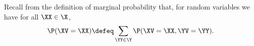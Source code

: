 \begin{definition}
  Recall from the definition of marginal probability that,
  for random variables 
  we have for all $\XX \in \X$,
  $$\P(\XV = \XX) \defeq \sum_{\YY \in \Y}\P(\XV = \XX, \YV = \YY).$$%
\end{definition}
